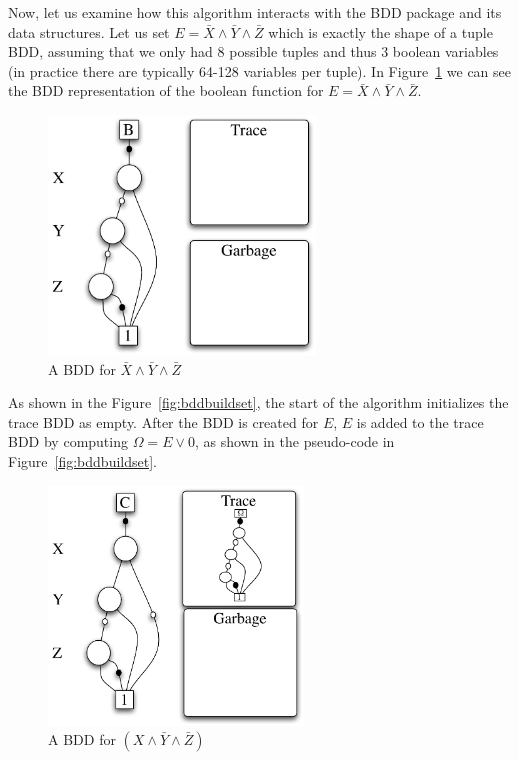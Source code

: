 \documentclass[defaultstyle,11pt]{thesis}
\begin{document}
Now, let us examine how this algorithm interacts with the BDD package
and its data structures.  Let us set $E =
\bar{X}\land\bar{Y}\land\bar{Z}$ which is exactly the shape of a tuple
BDD, assuming that we only had 8 possible tuples and thus 3 boolean
variables (in practice there are typically 64-128 variables per
tuple). In Figure~\ref{fig:bddtrace01} we can see the BDD
representation of the boolean function for $E =
\bar{X}\land\bar{Y}\land\bar{Z}$.

\begin{figure}
  \centering
  \includegraphics[height=2.5in]{figures/bddtrace01}
  \caption{A BDD for $\bar{X}\land\bar{Y}\land\bar{Z}$}
  \label{fig:bddtrace01}
\end{figure}

As shown in the Figure~\ref{fig:bddbuildset}, the start of the
algorithm initializes the trace BDD as empty.  After the BDD is
created for $E$, $E$ is added to the trace BDD by computing $\Omega =
E \lor 0$, as shown in the pseudo-code in
Figure~\ref{fig:bddbuildset}.

\begin{figure}
  \centering
  \includegraphics[height=2.5in]{figures/bddtrace02}
  \caption{A BDD for $(X\land\bar{Y}\land\bar{Z})$}
  \label{fig:bddtrace02}
\end{figure}
\end{document}
